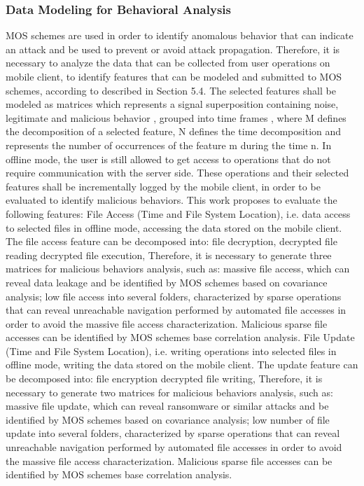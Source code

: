 \documentclass[twocolumn]{svjour3}          %
\begin{document}
\subsubsection{Data Modeling for Behavioral Analysis }
\label{sec_data}
 MOS schemes are used in order to identify anomalous behavior that can indicate an attack and be used to prevent or avoid attack propagation. Therefore, it is necessary to analyze the data that can be collected from user operations on mobile client, to identify features that can be modeled and submitted to MOS schemes, according to described in Section 5.4.
The selected features shall be modeled as matrices which represents a signal superposition containing noise, legitimate and malicious behavior \cite{tenorio2013greatest}, grouped into time frames , where M defines the decomposition of a selected feature, N defines the time decomposition and represents the number of occurrences of the feature m during the time n.
In offline mode, the user is still allowed to get access to operations that do not require communication with the server side. These operations and their selected features shall be incrementally logged by the mobile client, in order to be evaluated to identify malicious behaviors. This work proposes to evaluate the following features:
File Access (Time and File System Location), i.e. data access to selected files in offline mode, accessing the data stored on the mobile client. The file access feature can be decomposed into:
file decryption, 
decrypted file reading 
decrypted file execution, 
Therefore, it is necessary to generate three matrices for malicious behaviors analysis, such as: 
massive file access, which can reveal data leakage and be identified by MOS schemes based on covariance analysis; 
low file access into several folders, characterized by sparse operations that can reveal unreachable navigation performed by automated file accesses in order to avoid the massive file access characterization. 
Malicious sparse file accesses can be identified by MOS schemes base correlation analysis.
File Update (Time and File System Location), i.e. writing operations into selected files in offline mode, writing the data stored on the mobile client. The update feature can be decomposed into:
 file encryption 
decrypted file writing, 
Therefore, it is necessary to generate two matrices for malicious behaviors analysis, such as: 
massive file update, which can reveal ransomware or similar attacks and be identified by MOS schemes based on covariance analysis; 
low number of file update into several folders, characterized by sparse operations that can reveal unreachable navigation performed by automated file accesses in order to avoid the massive file access characterization. Malicious sparse file accesses can be identified by MOS schemes base correlation analysis.
\end{document}
